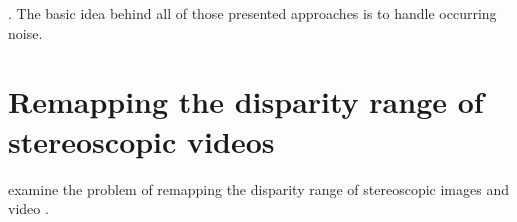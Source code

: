 
\noindent \citeauthor{khoshabeh2011spatio}.
\newline\newline\noindent The basic idea behind all of those presented approaches is to handle occurring noise.



\section{Remapping the disparity range of stereoscopic videos}

\citeauthor{lang2010nonlinear} examine the problem of remapping the disparity range of stereoscopic images and video \citep{lang2010nonlinear}.













